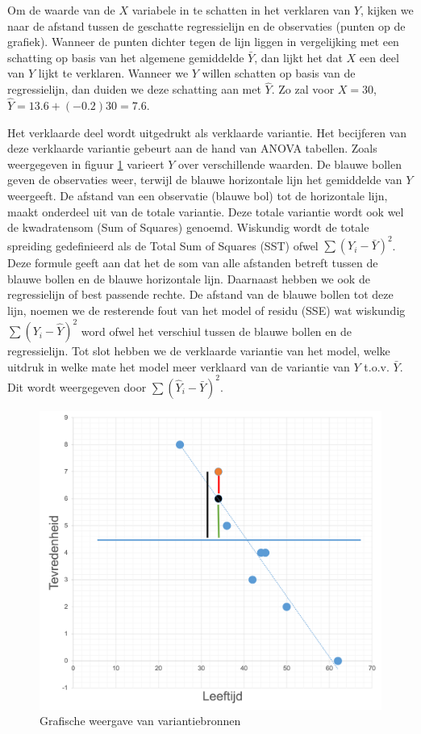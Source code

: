 \documentclass[
]{book}
\theoremstyle{definition}
\theoremstyle{definition}
\theoremstyle{definition}
\theoremstyle{definition}
\theoremstyle{remark}
\begin{document}
Om de waarde van de \(X\) variabele in te schatten in het verklaren van \(Y\), kijken we naar de afstand tussen de geschatte regressielijn en de observaties (punten op de grafiek). Wanneer de punten dichter tegen de lijn liggen in vergelijking met een schatting op basis van het algemene gemiddelde \(\bar{Y}\), dan lijkt het dat \(X\) een deel van \(Y\) lijkt te verklaren. Wanneer we \(Y\) willen schatten op basis van de regressielijn, dan duiden we deze schatting aan met \(\hat{Y}\). Zo zal voor \(X = 30\), \(\hat{Y} = 13.6 + (-0.2)30 = 7.6\).

Het verklaarde deel wordt uitgedrukt als verklaarde variantie. Het becijferen van deze verklaarde variantie gebeurt aan de hand van ANOVA tabellen. Zoals weergegeven in figuur \ref{fig:lmsst} varieert \(Y\) over verschillende waarden. De blauwe bollen geven de observaties weer, terwijl de blauwe horizontale lijn het gemiddelde van \(Y\) weergeeft. De afstand van een observatie (blauwe bol) tot de horizontale lijn, maakt onderdeel uit van de totale variantie. Deze totale variantie wordt ook wel de kwadratensom (Sum of Squares) genoemd. Wiskundig wordt de totale spreiding gedefinieerd als de Total Sum of Squares (SST) ofwel \(\sum ({Y}_i - \bar{Y})^2\). Deze formule geeft aan dat het de som van alle afstanden betreft tussen de blauwe bollen en de blauwe horizontale lijn. Daarnaast hebben we ook de regressielijn of best passende rechte. De afstand van de blauwe bollen tot deze lijn, noemen we de resterende fout van het model of residu (SSE) wat wiskundig \(\sum ({Y}_i - \hat{Y})^2\) word ofwel het verschiul tussen de blauwe bollen en de regressielijn. Tot slot hebben we de verklaarde variantie van het model, welke uitdruk in welke mate het model meer verklaard van de variantie van \(Y\) t.o.v. \(\bar{Y}\). Dit wordt weergegeven door \(\sum (\hat{Y}_i - \bar{Y})^2\).

\begin{figure}
\includegraphics[width=1\linewidth]{img/lm_sst} \caption{Grafische weergave van variantiebronnen}\label{fig:lmsst}
\end{figure}
\end{document}
